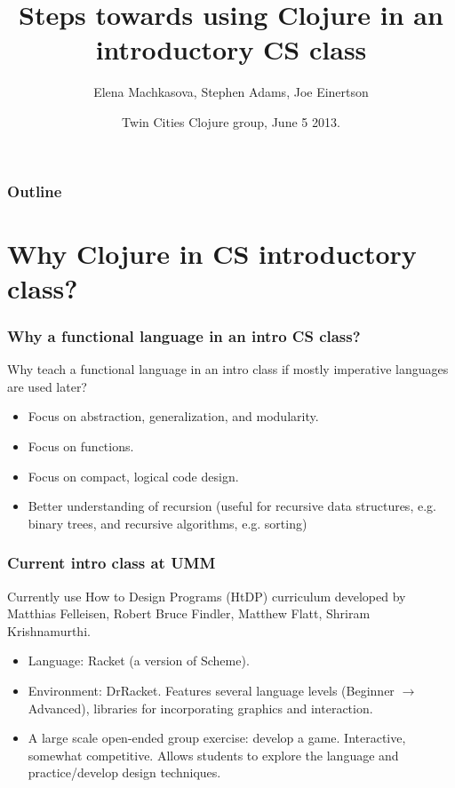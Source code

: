 \documentclass{beamer}
\newcommand{\allcomments}[1]{{#1}}
\newcommand{\elenacomment}[1]{{\bf \textcolor{ForestGreen}{\allcomments{{#1}}}}}
\begin{document}
\title{Steps towards using Clojure in an introductory CS class}
\author{Elena Machkasova, Stephen Adams, Joe Einertson}
\date[]  
{ Twin Cities Clojure group, June 5 2013.}

\begin{frame}
  \titlepage
\end{frame}

\begin{frame}

  \frametitle{Outline}
\tableofcontents
\end{frame}


\section{Why Clojure in CS introductory class?}


\begin{frame}
  \frametitle{Why a functional language in an intro CS class?}
Why teach a functional language in an intro class if mostly imperative languages are used later? 
\begin{itemize}
\item Focus on abstraction, generalization, and modularity. 
\item Focus on functions.
\item Focus on compact, logical code design. 
\item Better understanding of recursion (useful for recursive data structures, e.g. binary trees, and recursive algorithms, e.g. sorting)
\end{itemize}
\end{frame}


\begin{frame}
  \frametitle{Current intro class at UMM}
Currently use How to Design Programs (HtDP) curriculum developed by Matthias Felleisen, Robert Bruce Findler, Matthew Flatt, Shriram Krishnamurthi. 
\begin{itemize}
\item Language: Racket (a version of Scheme).
\item Environment: DrRacket. Features several language levels (Beginner $\to$ Advanced), libraries for incorporating graphics and interaction. 
\item A large scale open-ended group exercise: develop a game. Interactive, somewhat competitive. Allows students to explore the language and practice/develop design techniques. 
\end{itemize}
\end{frame}
\end{document}
